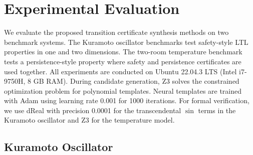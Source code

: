 \section{Experimental Evaluation}
\label{sec:experiments}


We evaluate the proposed transition certificate synthesis methods on two benchmark systems. The Kuramoto oscillator benchmarks test safety-style LTL properties in one and two dimensions. The two-room temperature benchmark tests a persistence-style property where safety and persistence certificates are used together. All experiments are conducted on Ubuntu 22.04.3 LTS (Intel i7-9750H, 8 GB RAM). During candidate generation, Z3 solves the constrained optimization problem for polynomial templates. Neural templates are trained with Adam using learning rate 0.001 for 1000 iterations. For formal verification, we use dReal with precision 0.0001 for the transcendental $\sin$ terms in the Kuramoto oscillator and Z3 for the temperature model.

\subsection{Kuramoto Oscillator}
